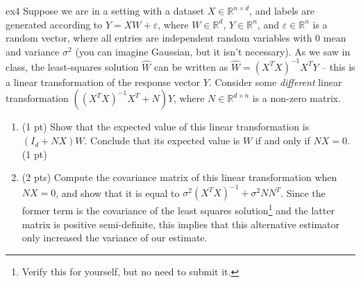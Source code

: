 \documentclass{tron}
\newcommand{\mref}[1]{\underline{\textbf{\hypersetup{linkcolor=orange}\Cref{#1}\hypersetup{linkcolor=blue}}}}
\begin{document}
\newpage
\setcounter{section}{4}
\begin{exercise}{ex4}
Suppose we are in a setting with a dataset $X \in \mathbb{R}^{n \times d}$, and labels are generated according to $Y = XW + \varepsilon$, where $W \in \mathbb{R}^d$, $Y \in \mathbb{R}^n$, and $\varepsilon \in \mathbb{R}^n$ is a random vector, where all entries are independent random variables with $0$ mean and variance $\sigma^2$ (you can imagine Gaussian, but it isn't necessary).
    As we saw in class, the least-squares solution $\hat W$ can be written as $\hat W = (X^T X)^{-1}X^T Y$ -- this is a linear transformation of the response vector $Y$.
    Consider some \emph{different} linear transformation $\left((X^T X)^{-1}X^T + N\right)Y$, where $N \in \mathbb{R}^{d \times n}$ is a non-zero matrix.
\begin{enumerate}
  \item (1 pt) Show that the expected value of this linear transformation is $(I_d + NX)W$.
    Conclude that its expected value is $W$ if and only if $NX = 0$. (1 pt)

    \ans{\mref{ans:4:1}} 
  \item (2 pts) Compute the covariance matrix of this linear transformation when $NX = 0$, and show that it is equal to $\sigma^2 (X^T X)^{-1} + \sigma^2 NN^T$.
    Since the former term is the covariance of the least squares solution\footnote{Verify this for yourself, but no need to submit it.} and the latter matrix is positive semi-definite, this implies that this alternative estimator only increased the variance of our estimate.

    \ans{\mref{ans:4:2}} 
\end{enumerate}
\end{exercise}
\setcounter{answer}{0}
\end{document}
